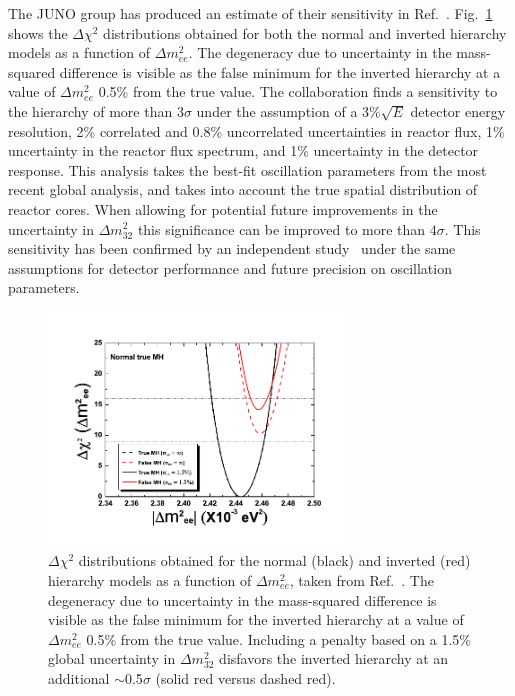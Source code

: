 The JUNO group has produced an estimate of their sensitivity in Ref.~\cite{liyf_dyb2_2013}.  Fig.~\ref{fig:dyb2Sens} shows the
${\Delta}\chi^2$ distributions obtained for both the normal and
inverted hierarchy models as a function of ${\Delta}m^2_{ee}$.  The
degeneracy due to uncertainty in the mass-squared difference is
visible as the false minimum for the inverted hierarchy at a value of
${\Delta}m^2_{ee}$ 0.5\% from the true value.  
The collaboration finds a sensitivity to the hierarchy of more than $3\sigma$ under the assumption of a 3\%$\sqrt E$ detector energy resolution, 2\% correlated and 0.8\% uncorrelated uncertainties in reactor flux, 1\% uncertainty in the reactor flux spectrum, and 1\% uncertainty in the detector response.  This analysis takes the best-fit oscillation parameters from the most recent global analysis, and takes into account the true spatial distribution of reactor cores.  When allowing for potential future improvements in the uncertainty in $\Delta m^2_{32}$ this significance can be improved to more than $4\sigma$.  
This sensitivity has been confirmed by an independent study~\cite{reac:indep} under the same assumptions for detector performance and future precision on oscillation parameters.

\begin{figure}[tb]
\centering
\includegraphics[width=0.7\textwidth]{DAD/Prior_NMH_15.pdf}
\caption{${\Delta}\chi^2$ distributions obtained for the normal
  (black) and inverted (red) hierarchy models as a function of
  ${\Delta}m^2_{ee}$, taken from Ref.~\cite{liyf_dyb2_2013}.  The
  degeneracy due to uncertainty in the mass-squared difference is
  visible as the false minimum for the inverted hierarchy at a value
  of ${\Delta}m^2_{ee}$ 0.5\% from the true value.  Including a
  penalty based on a 1.5\% global uncertainty in
  ${\Delta}m^2_{32}$ disfavors the inverted hierarchy at an
  additional $\sim$0.5$\sigma$ (solid red versus dashed red). }
\label{fig:dyb2Sens}
\vspace{-0.3cm}
\end{figure}

